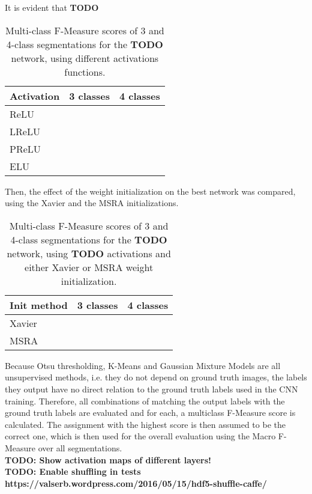 \noindent It is evident that \textbf{TODO}\\


\begin {table}
	\centering
	\begin {tabular}[!ht]{|l|c|c|}
		\hline
		\textbf{Activation}& \textbf{3 classes}& \textbf{4 classes}\\ \hline
		ReLU& & \\ \hline
		LReLU& & \\ \hline
		PReLU& & \\ \hline
		ELU& & \\ \hline
	\end {tabular}
\caption[]{Multi-class F-Measure scores of 3 and 4-class segmentations for the \textbf{TODO} network, using different activations functions.}
\end {table}

\noindent Then, the effect of the weight initialization on the best network was compared, using the Xavier and the MSRA initializations.

\begin {table}
	\centering
	\begin {tabular}[!ht]{|l|c|c|}
		\hline
		\textbf{Init method}& \textbf{3 classes}& \textbf{4 classes}\\ \hline
		Xavier& & \\ \hline
		MSRA& & \\ \hline
	\end {tabular}
\caption[]{Multi-class F-Measure scores of 3 and 4-class segmentations for the \textbf{TODO} network, using \textbf{TODO} activations and either Xavier or MSRA weight initialization.}
\end {table}



\noindent Because Otsu thresholding, K-Means and Gaussian Mixture Models are all unsupervised methods, i.e. they do not depend on ground truth images, the labels they output have no direct relation to the ground truth labels used in the CNN training. Therefore, all combinations of matching the output labels with the ground truth labels are evaluated and for each, a multiclass F-Measure score is calculated. The assignment with the highest score is then assumed to be the correct one, which is then used for the overall evaluation using the Macro F-Measure over all segmentations.\\

\textbf{TODO: Show activation maps of different layers!}\\
\textbf{TODO: Enable shuffling in tests https://valserb.wordpress.com/2016/05/15/hdf5-shuffle-caffe/}\\


